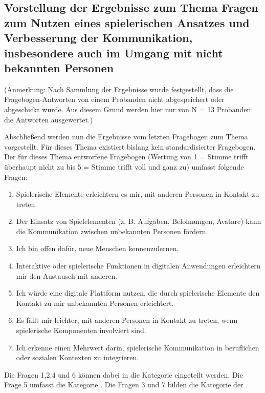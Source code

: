 \subsection{Vorstellung der Ergebnisse zum Thema Fragen zum Nutzen eines spielerischen Ansatzes und Verbesserung der Kommunikation, insbesondere auch im Umgang mit nicht bekannten Personen}
(Anmerkung: Nach Sammlung der Ergebnisse wurde festgestellt, dass die Fragebogen-Antworten von einem Probanden nicht abgespeichert oder abgeschickt wurde. Aus diesem Grund werden hier nur von N = 13 Probanden die Antworten ausgewertet.)

Abschließend werden nun die Ergebnisse vom letzten Fragebogen zum Thema  vorgestellt. Für dieses Thema existiert bislang kein standardisierter Fragebogen. Der für dieses Thema entworfene Fragebogen (Wertung von 1 = Stimme trifft überhaupt nicht zu bis 5 = Stimme trifft voll und ganz zu) umfasst folgende Fragen:
\begin{enumerate}
    \item Spielerische Elemente erleichtern es mir, mit anderen Personen in Kontakt zu treten.
    \item Der Einsatz von Spielelementen (z. B. Aufgaben, Belohnungen, Avatare) kann die Kommunikation zwischen unbekannten Personen fördern.
    \item Ich bin offen dafür, neue Menschen kennenzulernen.
    \item Interaktive oder spielerische Funktionen in digitalen Anwendungen erleichtern mir den Austausch mit anderen.
    \item Ich würde eine digitale Plattform nutzen, die durch spielerische Elemente den Kontakt zu mir unbekannten Personen erleichtert.
    \item Es fällt mir leichter, mit anderen Personen in Kontakt zu treten, wenn spielerische Komponenten involviert sind.
    \item Ich erkenne einen Mehrwert darin, spielerische Kommunikation in beruflichen oder sozialen Kontexten zu integrieren.
\end{enumerate}

Die Fragen 1,2,4 und 6 können dabei in die Kategorie  eingeteilt werden. Die Frage 5 umfasst die Kategorie . Die Fragen 3 und 7 bilden die Kategorie der .

